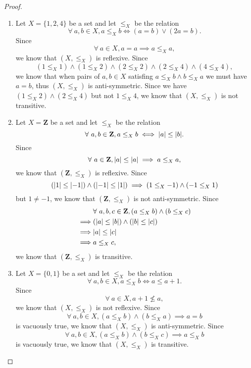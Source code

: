 \begin{proof}
    \begin{enumerate}
        \item Let \(X = \{1, 2, 4\}\) be a set and let \(\leq_X\) be the relation
              \[
                  \forall\ a, b \in X, a \leq_X b \iff (a = b) \lor (2a = b).
              \]
              Since
              \[
                  \forall\ a \in X, a = a \implies a \leq_X a,
              \]
              we know that \((X, \leq_X)\) is reflexive.
              Since
              \[
                  (1 \leq_X 1) \land (1 \leq_X 2) \land (2 \leq_X 2) \land (2 \leq_X 4) \land (4 \leq_X 4),
              \]
              we know that when pairs of \(a, b \in X\) satisfing \(a \leq_X b \land b \leq_X a\) we must have \(a = b\), thus \((X, \leq_X)\) is anti-symmetric.
              Since we have \((1 \leq_X 2) \land (2 \leq_X 4)\) but not \(1 \leq_X 4\), we know that \((X, \leq_X)\) is not transitive.
        \item Let \(X = \mathbf{Z}\) be a set and let \(\leq_X\) be the relation
              \[
                  \forall\ a, b \in \mathbf{Z}, a \leq_X b \iff \abs*{a} \leq \abs*{b}.
              \]
              Since
              \[
                  \forall\ a \in \mathbf{Z}, \abs*{a} \leq \abs*{a} \implies a \leq_X a,
              \]
              we know that \((\mathbf{Z}, \leq_X)\) is reflexive.
              Since
              \[
                  (\abs*{1} \leq \abs*{-1}) \land (\abs*{-1} \leq \abs*{1}) \implies (1 \leq_X -1) \land (-1 \leq_X 1)
              \]
              but \(1 \neq -1\), we know that \((\mathbf{Z}, \leq_X)\) is not anti-symmetric.
              Since
              \begin{align*}
                           & \forall\ a, b, c \in \mathbf{Z}, (a \leq_X b) \land (b \leq_X c) \\
                  \implies & (\abs*{a} \leq \abs*{b}) \land (\abs*{b} \leq \abs*{c})          \\
                  \implies & \abs*{a} \leq \abs*{c}                                           \\
                  \implies & a \leq_X c,
              \end{align*}
              we know that \((\mathbf{Z}, \leq_X)\) is transitive.
        \item Let \(X = \{0, 1\}\) be a set and let \(\leq_X\) be the relation
              \[
                  \forall\ a, b \in X, a \leq_X b \iff a \leq a + 1.
              \]
              Since
              \[
                  \forall\ a \in X, a + 1 \not\leq a,
              \]
              we know that \((X, \leq_X)\) is not reflexive.
              Since
              \[
                  \forall\ a, b \in X, (a \leq_X b) \land (b \leq_X a) \implies a = b
              \]
              is vacuously true, we know that \((X, \leq_X)\) is anti-symmetric.
              Since
              \[
                  \forall\ a, b \in X, (a \leq_X b) \land (b \leq_X c) \implies a \leq_X b
              \]
              is vacuously true, we know that \((X, \leq_X)\) is transitive.
    \end{enumerate}
\end{proof}


